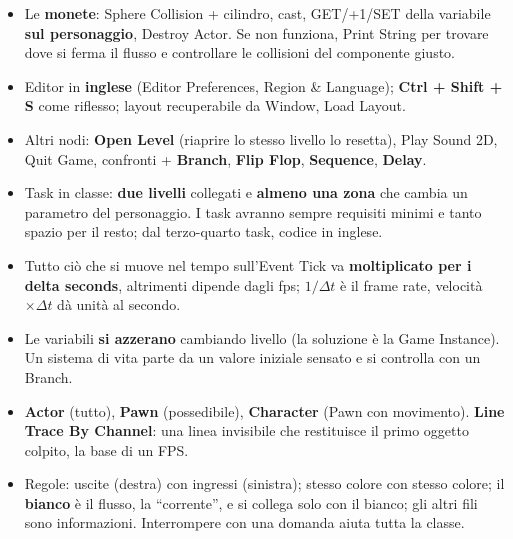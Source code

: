 \begin{itemize}
{        Actor}, \textbf{Simulate Physics}. Ogni componente ha parametri che
        si possono leggere e scrivere.
  \item Le \textbf{monete}: Sphere Collision + cilindro, cast, GET/+1/SET
        della variabile \textbf{sul personaggio}, Destroy Actor. Se non
        funziona, Print String per trovare dove si ferma il flusso e
        controllare le collisioni del componente giusto.
  \item Editor in \textbf{inglese} (Editor Preferences, Region \& Language);
        \textbf{Ctrl + Shift + S} come riflesso; layout recuperabile da
        Window, Load Layout.
  \item Altri nodi: \textbf{Open Level} (riaprire lo stesso livello lo
        resetta), Play Sound 2D, Quit Game, confronti + \textbf{Branch},
        \textbf{Flip Flop}, \textbf{Sequence}, \textbf{Delay}.
  \item Task in classe: \textbf{due livelli} collegati e \textbf{almeno una
        zona} che cambia un parametro del personaggio. I task avranno sempre
        requisiti minimi e tanto spazio per il resto; dal terzo-quarto task,
        codice in inglese.
  \item Tutto ciò che si muove nel tempo sull'Event Tick va
        \textbf{moltiplicato per i delta seconds}, altrimenti dipende dagli
        fps; $1/\Delta t$ è il frame rate, velocità $\times \Delta t$ dà unità
        al secondo.
  \item Le variabili \textbf{si azzerano} cambiando livello (la soluzione
        è la Game Instance). Un sistema di vita parte da un valore iniziale
        sensato e si controlla con un Branch.
  \item \textbf{Actor} (tutto), \textbf{Pawn} (possedibile),
        \textbf{Character} (Pawn con movimento). \textbf{Line Trace By
        Channel}: una linea invisibile che restituisce il primo oggetto
        colpito, la base di un FPS.
  \item Regole: uscite (destra) con ingressi (sinistra); stesso colore con
        stesso colore; il \textbf{bianco} è il flusso, la ``corrente'', e si
        collega solo con il bianco; gli altri fili sono informazioni.
        Interrompere con una domanda aiuta tutta la classe.
\end{itemize}
